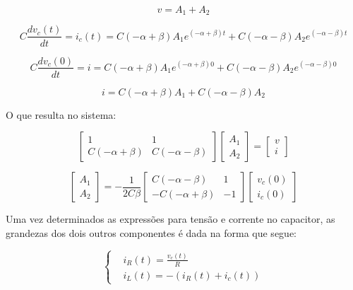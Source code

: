 \documentclass[12pt,fleqn]{book} %
\begin{document}
{\begin{equation}
v = A_1 + A_2
\end{equation}

\begin{equation}
C\frac{dv_c(t)}{dt} = i_c(t) = C(-\alpha + \beta)A_1e^{(-\alpha + \beta)t} + C(-\alpha - \beta)A_2e^{(-\alpha - \beta)t}
\end{equation}

\begin{equation}
C\frac{dv_c(0)}{dt} = i =  C(-\alpha + \beta)A_1e^{(-\alpha + \beta)0} + C(-\alpha - \beta)A_2e^{(-\alpha - \beta)0}
\end{equation}

\begin{equation}
i = C(-\alpha + \beta)A_1 + C(-\alpha - \beta)A_2
\end{equation}

O que resulta no sistema:

\begin{equation}
\begin{bmatrix}
1 & 1\\
C(-\alpha + \beta) & C(-\alpha - \beta)
\end{bmatrix}
\begin{bmatrix}
A_1\\A_2
\end{bmatrix}
=
\begin{bmatrix}
 v\\i
\end{bmatrix}
\end{equation}

\begin{equation}
\begin{bmatrix}
A_1\\A_2
\end{bmatrix}
=-\frac{1}{2C\beta}
\begin{bmatrix}
C(-\alpha - \beta) & 1\\
-C(-\alpha + \beta) & -1
\end{bmatrix}
\begin{bmatrix}
 v_c(0)\\i_c(0)
\end{bmatrix}
\end{equation}

Uma vez determinados as expressões para tensão e corrente no capacitor, as grandezas dos dois outros componentes é dada na forma que segue:

\begin{equation}
\left\{\begin{aligned} & 
        i_R(t) = \frac{v_c(t)}{R}\\&       
        i_L(t) = -(i_R(t) + i_c(t))
    \end{aligned}\right.
\end{equation}

}
\end{document}
